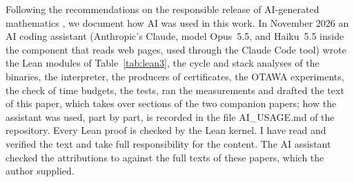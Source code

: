 \documentclass[oneside,english]{amsart}
\numberwithin{equation}{section}
\theoremstyle{plain}
\theoremstyle{definition}
\theoremstyle{plain}
\theoremstyle{plain}
\theoremstyle{remark}
\newcommand{\lean}[1]{{\ttfamily\small #1}}
\begin{document}
Following the recommendations on the responsible release of AI-generated mathematics \cite{agmai2026responsible}, we document how AI was used in this work. In November 2026 an AI coding assistant (Anthropic's Claude, model Opus~5.5, and Haiku~5.5 inside the component that reads web pages, used through the Claude Code tool) wrote the Lean modules of Table~\ref{tab:lean3}, the cycle and stack analyses of the binaries, the interpreter, the producers of certificates, the OTAWA experiments, the check of time budgets, the tests, ran the measurements and drafted the text of this paper, which takes over sections of the two companion papers; how the assistant was used, part by part, is recorded in the file \lean{AI\_USAGE.md} of the repository. Every Lean proof is checked by the Lean kernel. I have read and verified the text and take full responsibility for the content. The AI assistant checked the attributions to \cite{cullmann2007data,crary2000resource,sewell2016complete,granger1989static} against the full texts of these papers, which the author supplied.



\end{document}
